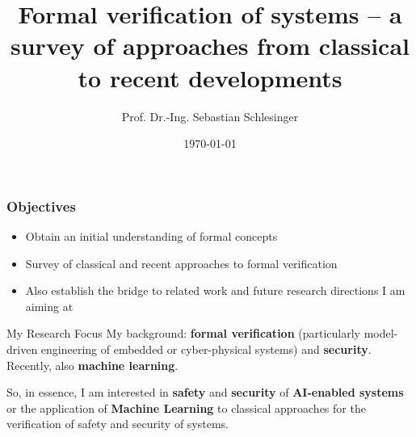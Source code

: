 \documentclass{beamer}
\title[Formal Verification]{Formal verification of systems -- a survey of approaches from classical to recent developments}
\author[Sebastian Schlesinger]{Prof. Dr.-Ing. Sebastian Schlesinger}
\institute[HWR Berlin]{Berlin School for Economics and Law}
\date{\today}
\begin{document}
 \begin{frame}
\titlepage
\end{frame}
\begin{frame}
\frametitle{Objectives}
\begin{itemize}
\item Obtain an initial understanding of formal concepts
\item Survey of classical and recent approaches to formal verification
\item Also establish the bridge to related work and future research directions I am aiming at
 
\end{itemize}

\end{frame}
\begin{frame}{My Research Focus}
  My background: \textbf{formal verification} (particularly model-driven engineering of embedded or cyber-physical systems) and \textbf{security}. 
  Recently, also \textbf{machine learning}. 

  So, in essence, I am interested in \textbf{safety} and \textbf{security} of \textbf{AI-enabled systems} or the application of \textbf{Machine Learning} to classical approaches for the verification of safety and security of systems.
  \begin{center}
\end{center}
\end{frame}
\end{document}

